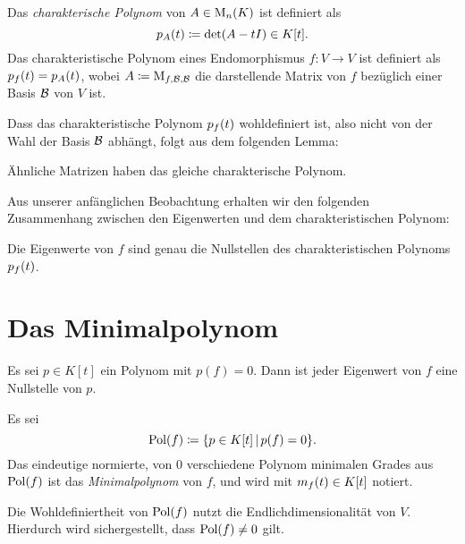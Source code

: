 \begin{definition}
  Das \emph{charakterische Polynom} von $A \in \operatorname{M}_{n}(K)$ ist definiert als
  \[
              p_{A}(t)
    \coloneqq \det ( A - t I )
    \in       K[t].
  \]
  Das charakteristische Polynom eines Endomorphismus $f \colon V \to V$ ist definiert als $p_{f}(t) = p_{A}(t)$, wobei $A \coloneqq \operatorname{M}_{f, \mathcal{B}, \mathcal{B}}$ die darstellende Matrix von $f$ bezüglich einer Basis $\mathcal{B}$ von $V$ ist.
\end{definition}

Dass das charakteristische Polynom $p_{f}(t)$ wohldefiniert ist, also nicht von der Wahl der Basis $\mathcal{B}$ abhängt, folgt aus dem folgenden Lemma:

\begin{lemma}
  Ähnliche Matrizen haben das gleiche charakterische Polynom.
\end{lemma}

Aus unserer anfänglichen Beobachtung erhalten wir den folgenden Zusammenhang zwischen den Eigenwerten und dem charakteristischen Polynom:

\begin{proposition}
  Die Eigenwerte von $f$ sind genau die Nullstellen des charakteristischen Polynoms $p_{f}(t)$.
\end{proposition}





\section{Das Minimalpolynom}

\begin{lemma}
  \label{lemma: polynomial equations give restriction for the eigenvalues}
  Es sei $p \in K[t]$ ein Polynom mit $p(f) = 0$.
  Dann ist jeder Eigenwert von $f$ eine Nullstelle von $p$.
\end{lemma}

\begin{definition}
  Es sei
  \[
              \operatorname{Pol}(f)
    \coloneqq \{ p \in K[t] \,|\, p(f) = 0 \}.
  \]
  Das eindeutige normierte, von $0$ verschiedene Polynom minimalen Grades aus $\operatorname{Pol}(f)$ ist das \emph{Minimalpolynom} von $f$, und wird mit $m_{f}(t) \in K[t]$ notiert.
\end{definition}

\begin{remark}
  Die Wohldefiniertheit von $\operatorname{Pol}(f)$ nutzt die Endlichdimensionalität von $V$.
  Hierdurch wird sichergestellt, dass $\operatorname{Pol}(f) \neq 0$ gilt.
\end{remark}

